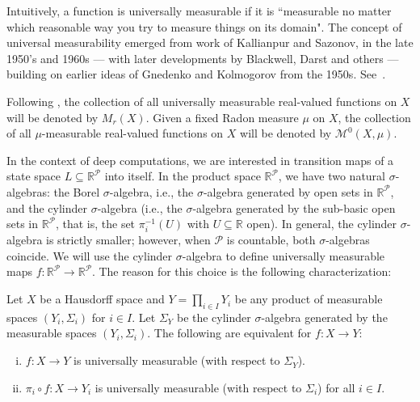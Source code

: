 Intuitively, a function is universally measurable if it is ``measurable no matter which reasonable way you try to measure things on its domain".
The concept of universal measurability emerged from work of Kallianpur and Sazonov, in the late 1950's and 1960s --- with later developments by Blackwell, Darst and others --- building on earlier ideas of Gnedenko and Kolmogorov from the 1950s.
See~\cite[Chapters 1 and 2]{Pap:2002}.

\begin{notation}
    Following \cite{BFT_1978_PCompactBaire}, the collection of all universally measurable real-valued functions on $X$ will be denoted by $M_r(X)$.
    Given a fixed Radon measure $\mu$ on $X$, the collection of all $\mu$-measurable real-valued functions on $X$ will be denoted by $\mathscr{M}^0(X,\mu)$.
\end{notation}

In the context of deep computations, we are interested in transition maps of a state space $L\subseteq \mathbb{R}^\mathcal{P}$ into itself.
In the product space $\mathbb{R}^\mathcal{P}$, we have two natural $\sigma$-algebras: 
the Borel $\sigma$-algebra, i.e., the $\sigma$-algebra generated by open sets in $\mathbb{R}^\mathcal{P}$, and the cylinder $\sigma$-algebra (i.e., the $\sigma$-algebra generated by the sub-basic open sets in $\mathbb{R}^\mathcal{P}$, that is, the set $\pi_i^{-1}(U)$ with $U\subseteq \mathbb{R}$ open).
In general, the cylinder $\sigma$-algebra is strictly smaller; however, when $\mathcal{P}$ is countable, both $\sigma$-algebras coincide.
We will use the cylinder $\sigma$-algebra to define universally measurable maps $f\colon\mathbb{R}^\mathcal{P}\to\mathbb{R}^\mathcal{P}$.
The reason for this choice is the following characterization:

\begin{proposition}\label{prop:coordinated_univ_meas}
    Let $X$ be a Hausdorff space and $Y=\prod_{i\in I}Y_i$ be any product of measurable spaces $(Y_i,\Sigma_i)$ for $i\in I$.
    Let $\Sigma_Y$ be the cylinder $\sigma$-algebra generated by the measurable spaces $(Y_i,\Sigma_i)$.
    The following are equivalent for $f\colon X\to Y$:
    \begin{enumerate}[(i)]
        \item $f\colon X\to Y$ is universally measurable (with respect to $\Sigma_Y$).
        \item $\pi_i\circ f\colon X\to Y_i$ is universally measurable (with respect to $\Sigma_i$) for all $i\in I$.
    \end{enumerate}
\end{proposition}

